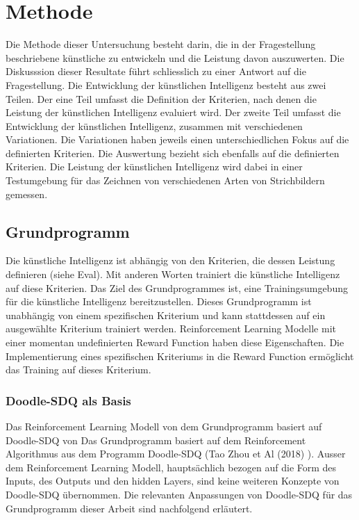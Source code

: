 \chapter{Methode}
Die Methode dieser Untersuchung besteht darin, die in der Fragestellung
beschriebene künstliche zu entwickeln und die Leistung davon auszuwerten. Die
Diskusssion dieser Resultate führt schliesslich zu einer Antwort auf die
Fragestellung. 
Die Entwicklung der künstlichen Intelligenz besteht aus zwei Teilen. Der eine
Teil umfasst die Definition der Kriterien, nach denen die Leistung der
künstlichen Intelligenz evaluiert wird. Der zweite Teil umfasst die Entwicklung
der künstlichen Intelligenz, zusammen mit verschiedenen Variationen. Die
Variationen haben jeweils einen unterschiedlichen Fokus auf die definierten
Kriterien. Die Auswertung bezieht sich ebenfalls auf die definierten Kriterien.
Die Leistung der künstlichen Intelligenz wird dabei in einer Testumgebung für
das Zeichnen von verschiedenen Arten von Strichbildern gemessen.


\section{Grundprogramm}
\label{chap:m_grundprogramm}
Die künstliche Intelligenz ist abhängig von den Kriterien, die dessen Leistung
definieren (siehe Eval). Mit anderen Worten trainiert die künstliche Intelligenz
auf diese Kriterien. Das Ziel des Grundprogrammes ist, eine Trainingsumgebung
für die künstliche Intelligenz bereitzustellen. Dieses Grundprogramm ist
unabhängig von einem spezifischen Kriterium und kann stattdessen auf ein
ausgewählte Kriterium trainiert werden. Reinforcement Learning Modelle mit einer
momentan undefinierten Reward Function haben diese Eigenschaften. Die
Implementierung eines spezifischen Kriteriums in die Reward Function ermöglicht
das Training auf dieses Kriterium. 

\subsection{Doodle-SDQ als Basis}
Das Reinforcement Learning Modell von dem Grundprogramm basiert auf Doodle-SDQ
von Das Grundprogramm basiert auf dem Reinforcement Algorithmus aus dem Programm
Doodle-SDQ (Tao Zhou et Al (2018) \cite{zhou_learning_2018}). Ausser dem
Reinforcement Learning Modell, hauptsächlich bezogen auf die Form des Inputs,
des Outputs und den hidden Layers, sind keine weiteren Konzepte von Doodle-SDQ
übernommen. Die relevanten Anpassungen von Doodle-SDQ für das Grundprogramm
dieser Arbeit sind nachfolgend erläutert.


